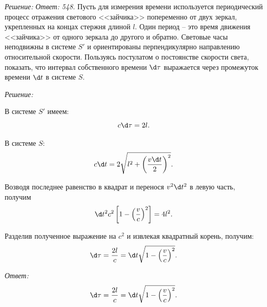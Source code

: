 \vspace*{2em}
\emph{Решение:}
\vfill
\emph{Ответ:}
\newpage
\emph{548.} Пусть для измерения времени используется периодический процесс
отражения светового <<зайчика>> попеременно от двух зеркал, укрепленных на
концах стержня длиной \( l \). Один период -- это время движения <<зайчика>> от
одного зеркала до другого и обратно. Световые часы неподвижны в системе \( S' \)
и ориентированы перпендикулярно направлению относительной скорости.
Пользуясь постулатом о постоянстве скорости света, показать, что интервал
собственного времени \( \d\tau \) выражается через промежуток времени \( \d t \)
в системе \( S \).

\vspace*{2em}
\emph{Решение:}
    
    В системе \( S' \) имеем:
    \[
        c\d\tau = 2l.
    \]
    
    В системе \( S \):
    \[
        c\d t = 2\sqrt{l^2 + \left(\frac{v\d t}{2}\right)^2}.
    \]
    
    Возводя последнее равенство в квадрат и перенося \( v^2\d t^2 \) в левую часть,
    получим
    \[
        \d t^2c^2\left[1 - \left(\frac{v}{c}\right)^2\right] = 4l^2.
    \]
    
    Разделив полученное выражение на \( c^2 \) и извлекая квадратный корень,
    получим:
    \[
        \d\tau = \frac{2l}{c} = \d t\sqrt{1 - \left(\frac{v}{c}\right)^2}.
    \]
    
\vfill
\emph{Ответ:}
    \[
        \d\tau = \frac{2l}{c} = \d t\sqrt{1 - \left(\frac{v}{c}\right)^2}.
    \]

